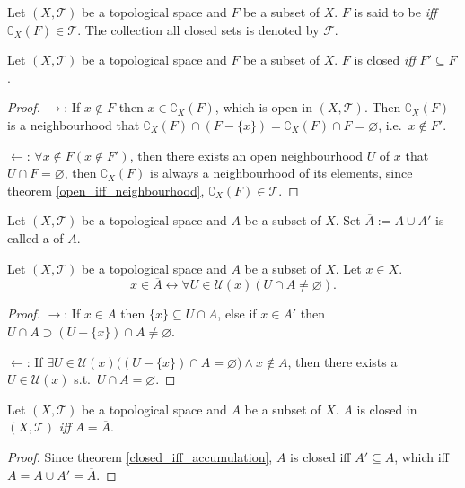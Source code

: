 \documentclass[openany]{book}
\begin{document}
\begin{definition}\label{closed_set}
Let $(X,\mathscr T)$ be a topological space and $F$ be a subset of $X$. $F$ is said to be  \emph{iff} $\complement_X (F) \in \mathscr T$. The collection all closed sets is denoted by $\mathscr F$.
\end{definition}

\begin{theorem}\label{closed_iff_accumulation}
Let $(X,\mathscr T)$ be a topological space and $F$ be a subset of $X$. $F$ is closed \emph{iff} $ F'  \subseteq F$.
\end{theorem}
\begin{proof}
$\to$: 
If $x\notin F$ then $x\in \complement_X (F)$, which is open in $(X,\mathscr T)$. 
Then $\complement_X (F)$ is a neighbourhood that $\complement_X (F) \cap (F-\{x\}) = \complement_X (F) \cap F =\varnothing$, i.e.\ $x\notin F'$.

$\leftarrow$:
$\forall x\notin F(x\notin F')$, then there exists an open neighbourhood $U$ of $x$ that $U\cap F = \varnothing$, then $\complement_X (F)$ is always a neighbourhood of its elements, since theorem \ref{open_iff_neighbourhood}, $\complement_X (F) \in \mathscr T$.
\end{proof}

\begin{definition}\label{closure}
Let $(X,\mathscr T)$ be a topological space and $A$ be a subset of $X$. Set $\overline A := A\cup A'$ is called a  of $A$.
\end{definition}

\begin{theorem}\label{closure_neighbourhood}
Let $(X,\mathscr T)$ be a topological space and $A$ be a subset of $X$. Let $x\in X$.
\[
	x\in \overline A \leftrightarrow
		\forall U\in\mathscr U(x)(
			U\cap A\neq \varnothing).
\]
\end{theorem}
\begin{proof}
$\to$: If $x\in A$ then $\{x\}\subseteq U\cap A$, 
else if $x\in A'$ then $U\cap A \supset (U-\{x\})\cap A \neq \varnothing$.

$\leftarrow$: 
If $\exists U\in\mathscr U(x)\big(
	(U-\{x\})\cap A= \varnothing\big)\wedge x\notin A$, 
then there exists a $U\in \mathscr U(x)$ s.t.\ $U\cap A=\varnothing$. 
\end{proof}


\begin{theorem}\label{closed_iff_closure}
Let $(X,\mathscr T)$ be a topological space and $A$ be a subset of $X$. 
$A$ is closed in $(X,\mathscr T)$ \emph{iff} $A=\overline A$.
\end{theorem}
\begin{proof}
Since theorem \ref{closed_iff_accumulation}, $A$ is closed iff $A'\subseteq A$, which iff $A = A\cup A' = \overline A$.
\end{proof}
\end{document}

